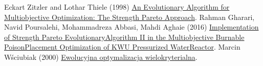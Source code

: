 \documentclass[a4paper]{article}
\begin{document}
\begin{thebibliography}{9}
Eckart Zitzler and Lothar Thiele (1998) \href{https://sop.tik.ee.ethz.ch/publicationListFiles/zt1998a.pdf}{An Evolutionary Algorithm for
Multiobjective Optimization: The Strength Pareto Approach}.
Rahman Gharari, Navid Poursalehi, Mohammadreza Abbasi, Mahdi Aghaie (2016) \href{https://reader.elsevier.com/reader/sd/pii/S1738573316300493?token=C05246879BE6CF68BC0862DBF5EC6B3BA49BC955850FBB6B93FF1D5A0D475BFF7A74823972A48F62520CAA1D1A185FE5&originRegion=eu-west-1&originCreation=20211202160112}{Implementation of Strength Pareto EvolutionaryAlgorithm II in the Multiobjective Burnable PoisonPlacement Optimization of KWU Pressurized WaterReactor}.
Marcin Wściubiak (2000) \href{https://www.ii.pwr.edu.pl/~kwasnicka/tekstystudenckie/ewoptymwielokryt.pdf}{Ewolucyjna optymalizacja wielokryterialna}.
\end{thebibliography}
\end{document}

